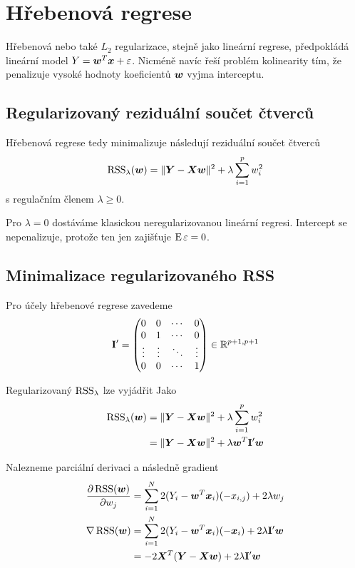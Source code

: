 \documentclass[../main.tex]{subfiles}
\begin{document}
\section{Hřebenová regrese} \label{sec:ridge}

Hřebenová nebo také $L_2$ regularizace, stejně jako lineární regrese, předpokládá lineární model $Y = \bm{w}^T \bm{x} + \varepsilon$. Nicméně navíc řeší problém kolinearity tím, že penalizuje vysoké hodnoty koeficientů $\bm{w}$ vyjma interceptu.

\subsection{Regularizovaný reziduální součet čtverců}

Hřebenová regrese tedy minimalizuje následují reziduální součet čtverců
\[ \operatorname{RSS}_\lambda(\bm{w}) = \| \bm{Y} - \bm{X} \bm{w} \|^2 + \lambda \sum_{i=1}^{p} w_i^2 \]
s regulačním členem $\lambda \ge 0$.

Pro $\lambda = 0$ dostáváme klasickou neregularizovanou lineární regresi. Intercept se nepenalizuje, protože ten jen zajišťuje $\operatorname{E} \varepsilon = 0$.

\subsection{Minimalizace regularizovaného RSS}

Pro účely hřebenové regrese zavedeme
\[\mathbf{}
    \mathbf{I}' =
    \begin{pmatrix}
        0      & 0      & \cdots & 0      \\
        0      & 1      & \cdots & 0      \\
        \vdots & \vdots & \ddots & \vdots \\
        0      & 0      & \cdots & 1
    \end{pmatrix}
    \in \mathbb{R}^{p+1, p+1}
\]

Regularizovaný $\operatorname{RSS}_\lambda$ lze vyjádřit Jako
\begin{align*}
    \operatorname{RSS}_\lambda(\bm{w})
     & = \| \bm{Y} - \bm{X} \bm{w} \|^2 + \lambda \sum_{i=1}^{p} w_i^2  \\
     & = \| \bm{Y} - \bm{X} \bm{w} \|^2 + \lambda \bm{w}^T \mathbf{I}' \bm{w}
\end{align*}

Nalezneme parciální derivaci a následně gradient
\begin{align*}
    \pdv{\operatorname{RSS}(\bm{w})}{w_j}
     & = \sum_{i=1}^{N} 2 (Y_i - \bm{w}^T \bm{x}_i) (-x_{i, j}) + 2 \lambda w_j         \\
    \nabla \operatorname{RSS}(\bm{w})
     & = \sum_{i=1}^{N} 2 (Y_i - \bm{w}^T \bm{x}_i) (-\bm{x}_i) + 2 \lambda \mathbf{I}' \bm{w} \\
     & = -2 \bm{X}^T (\bm{Y} - \bm{X}\bm{w}) + 2 \lambda \mathbf{I}' \bm{w}
\end{align*}
\end{document}
